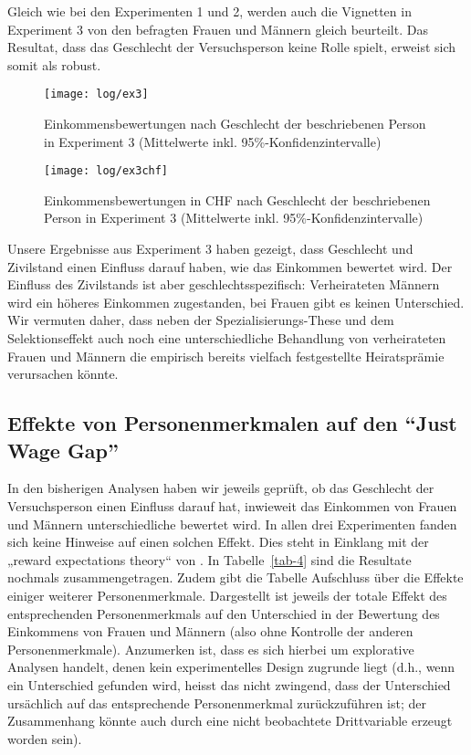 \documentclass[a4paper,12pt]{article}
\renewcommand{\baselinestretch}{1.1}
\newif\ifcomments
\newcommand{\comment}[1]{%
    \ifcomments\marginpar{\renewcommand{\baselinestretch}{1}\tiny\hspace*{-1.1em}\colorbox{gray!20}%
    {\textcolor{red}{\parbox[t]{.9in}{\raggedright #1}}}}\fi}
\begin{document}
Gleich wie bei den Experimenten 1 und 2, werden auch die Vignetten in Experiment 3 von den befragten Frauen und Männern gleich beurteilt. Das Resultat, dass das Geschlecht der Versuchsperson keine Rolle spielt, erweist sich somit als robust. \comment{Ergänzt.}

\begin{figure}[p]\centering
    \texttt{[image: log/ex3]}
    \caption{Einkommensbewertungen nach Geschlecht der beschriebenen Person in 
    Experiment 3 (Mittelwerte inkl. 95\%-Konfidenzintervalle)}\label{fig-ex3}
\end{figure}

\begin{figure}[p]\centering
    \texttt{[image: log/ex3chf]}
    \caption{Einkommensbewertungen in CHF nach Geschlecht der beschriebenen Person in 
    Experiment 3 (Mittelwerte inkl. 95\%-Konfidenzintervalle)}\label{fig-ex3chf}
\end{figure}

\comment{2 Abschnitte zu Heiratsbonus nach oben verschoben.}

Unsere Ergebnisse aus Experiment 3 haben gezeigt, dass Geschlecht und
Zivilstand einen Einfluss darauf haben, wie das Einkommen bewertet wird. Der
Einfluss des Zivilstands ist aber geschlechtsspezifisch: Verheirateten Männern
wird ein höheres Einkommen zugestanden, bei Frauen gibt es keinen Unterschied.
Wir vermuten daher, dass neben der Spezialisierungs-These und dem
Selektionseffekt auch noch eine unterschiedliche Behandlung von verheirateten
Frauen und Männern die empirisch bereits vielfach festgestellte Heiratsprämie
verursachen könnte.

\subsection{Effekte von Personenmerkmalen auf den “Just Wage Gap”}

In den bisherigen Analysen haben wir jeweils geprüft, ob das Geschlecht der
Versuchsperson einen Einfluss darauf hat, inwieweit das Einkommen von Frauen
und Männern unterschiedliche bewertet wird. In allen drei Experimenten fanden
sich keine Hinweise auf einen solchen Effekt. Dies steht in Einklang mit der
„reward expectations theory“ von \citet{Auspurg-etal-2017}. In
Tabelle~\ref{tab-4} sind die Resultate nochmals zusammengetragen. Zudem gibt
die Tabelle Aufschluss über die Effekte einiger weiterer Personenmerkmale.
Dargestellt ist jeweils der totale Effekt des entsprechenden Personenmerkmals
auf den Unterschied in der Bewertung des Einkommens von Frauen und Männern
(also ohne Kontrolle der anderen Personenmerkmale). Anzumerken ist, dass es
sich hierbei um explorative Analysen handelt, denen kein experimentelles Design
zugrunde liegt (d.h., wenn ein Unterschied gefunden wird, heisst das nicht
zwingend, dass der Unterschied ursächlich auf das entsprechende Personenmerkmal
zurückzuführen ist; der Zusammenhang könnte auch durch eine nicht beobachtete
Drittvariable erzeugt worden sein).
\end{document}

